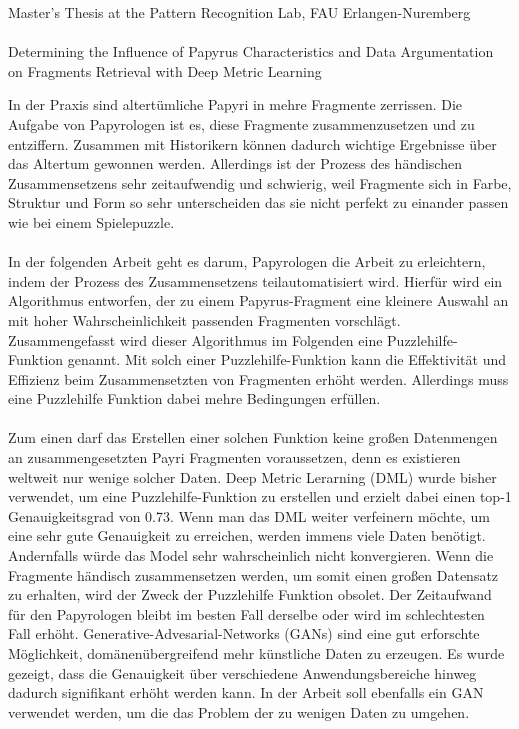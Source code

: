 \documentclass[12pt,a4paper]{article}
\begin{document}
\begin{center}
	Master's Thesis at the Pattern Recognition Lab, FAU Erlangen-Nuremberg \hfill \\[5mm]
																				
	\mbox{}\\
	{\Large Determining the Influence of Papyrus Characteristics and Data Argumentation on Fragments Retrieval with Deep Metric Learning}
			
\end{center}


In der Praxis sind altertümliche Papyri in mehre Fragmente zerrissen. 
Die Aufgabe von Papyrologen ist es, diese Fragmente zusammenzusetzen und zu entziffern. Zusammen mit Historikern können dadurch wichtige Ergebnisse über das Altertum gewonnen werden. Allerdings ist der Prozess des händischen Zusammensetzens sehr zeitaufwendig und schwierig, weil Fragmente sich in Farbe, Struktur und Form so sehr unterscheiden das sie nicht perfekt zu einander passen wie bei einem Spielepuzzle. 
\\\\
In der folgenden Arbeit geht es darum, Papyrologen die Arbeit zu erleichtern, indem der Prozess des Zusammensetzens teilautomatisiert wird. 
Hierfür wird ein Algorithmus entworfen, der zu einem Papyrus-Fragment eine kleinere Auswahl an mit hoher Wahrscheinlichkeit passenden Fragmenten vorschlägt. 
Zusammengefasst wird dieser Algorithmus im Folgenden eine Puzzlehilfe-Funktion genannt.
Mit solch einer Puzzlehilfe-Funktion kann die Effektivität und Effizienz beim Zusammensetzten von Fragmenten erhöht werden. 
Allerdings muss eine Puzzlehilfe Funktion dabei mehre Bedingungen erfüllen.
\\\\
Zum einen darf das Erstellen einer solchen Funktion keine großen Datenmengen an zusammengesetzten Payri Fragmenten voraussetzen, denn es existieren weltweit nur wenige solcher Daten. Deep Metric Lerarning (DML) wurde bisher verwendet, um eine Puzzlehilfe-Funktion zu erstellen und erzielt dabei einen top-1 Genauigkeitsgrad von 0.73. 
Wenn man das DML weiter verfeinern möchte, um eine sehr gute Genauigkeit zu erreichen, werden immens viele Daten benötigt. Andernfalls würde das Model sehr wahrscheinlich nicht konvergieren. Wenn die Fragmente händisch zusammensetzen werden, um somit einen großen Datensatz zu erhalten, wird der Zweck der Puzzlehilfe Funktion obsolet.
Der Zeitaufwand für den Papyrologen bleibt im besten Fall derselbe oder wird im schlechtesten Fall erhöht. Generative-Advesarial-Networks (GANs) sind eine gut erforschte Möglichkeit, domänenübergreifend mehr künstliche Daten zu erzeugen. Es wurde gezeigt, dass die Genauigkeit über verschiedene Anwendungsbereiche hinweg dadurch signifikant erhöht werden kann. In der Arbeit soll ebenfalls ein GAN verwendet werden, um die das Problem der zu wenigen Daten zu umgehen. 
\end{document}
